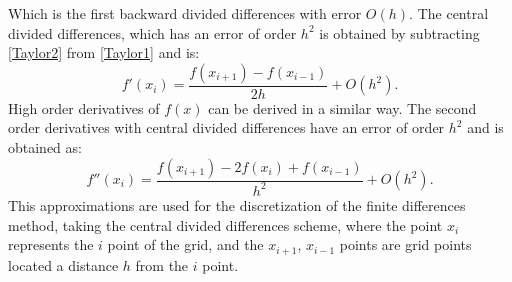 \documentclass[a4paper,10pt]{report}
\begin{document}
Which is the first backward divided differences with error $O(h)$.
The central divided differences, which has an error of order $h^2$ is obtained by subtracting 
\eqref{Taylor2} from \eqref{Taylor1} and is:
\begin{equation}
 f'(x_i)=\frac{f(x_{i+1})-f(x_{i-1})}{2h}+O(h^2). 
\end{equation}
High order derivatives of $f(x)$ can be derived in a similar way. The second order derivatives with central divided 
differences have an error of order $h^2$ and is obtained as:
\begin{equation}
 f''(x_i)=\frac{f(x_{i+1})-2f(x_i)+f(x_{i-1})}{h^2}+O(h^2). \label{der2}
\end{equation}
This approximations are used for the discretization of the finite differences method, taking the central divided differences scheme, 
where the point $x_i$ represents the $i$ point of the grid, and the $x_{i+1}$, $x_{i-1}$ points are grid points located a distance $h$ from the $i$ point.
\end{document}
